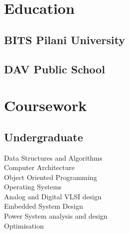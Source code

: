 \documentclass[]{deedy-resume-openfont}
\begin{document}
%
%
\lastupdated

%
%

%
%

\begin{minipage}[t]{0.33\textwidth} 


\section{Education} 
\vspace{\topsep}
\subsection{BITS Pilani University}
\sectionsep

\subsection{DAV Public School}
\vspace{\topsep}
\sectionsep


\section{Coursework}
\vspace{\topsep}
\subsection{Undergraduate}
Data Structures and Algorithms \\
Computer Architecture\\
Object Oriented Programming\\
Operating Systems \\
Analog and Digital VLSI design\\
Embedded System Design\\
Power System analysis and design\\
Optimisation\\
\vspace{\topsep}
\vspace{\topsep}

\end{minipage}
\end{document}
